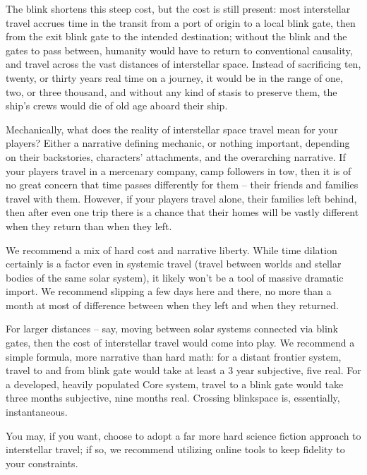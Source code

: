 The blink shortens this steep cost, but the cost is still present: most interstellar travel accrues time  
in the transit from a port of origin to a local blink gate, then from the exit blink gate to the intended  
destination; without the blink and the gates to pass between, humanity would have to return to  
conventional causality, and travel across the vast distances of interstellar space. Instead of  
sacrificing ten, twenty, or thirty years real time on a journey, it would be in the range of one, two,  
or three thousand, and without any kind of stasis to preserve them, the ship’s crews would die of  
old age aboard their ship.   

Mechanically, what does the reality of interstellar space travel mean for your players? Either a  
narrative defining mechanic, or nothing important, depending on their backstories, characters’  
attachments, and the overarching narrative. If your players travel in a mercenary company, camp  
followers in tow, then it is of no great concern that time passes differently for them -- their friends  
and families travel with them. However, if your players travel alone, their families left behind, then  
after even one trip there is a chance that their homes will be vastly different when they return than  
when they left.   

                                                                                                           


We recommend a mix of hard cost and narrative liberty. While time dilation certainly is a factor  
even in systemic travel (travel between worlds and stellar bodies of the same solar system), it  
likely won’t be a tool of massive dramatic import. We recommend slipping a few days here and  
there, no more than a month at most of difference between when they left and when they  
returned.   

For larger distances -- say, moving between solar systems connected via blink gates, then the  
cost of interstellar travel would come into play. We recommend a simple formula, more narrative  
than hard math: for a distant frontier system, travel to and from blink gate would take at least a  
     3 
year  subjective, five real. For a developed, heavily populated Core system, travel to a blink gate  
would take three months subjective, nine months real. Crossing blinkspace is, essentially,  
instantaneous.     

You may, if you want, choose to adopt a far more hard science fiction approach to interstellar  
travel; if so, we recommend utilizing online tools to keep fidelity to your constraints.  

